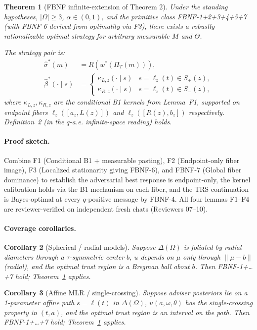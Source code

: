 \documentclass[11pt]{article}
\newtheorem{theorem}{Theorem}
\newtheorem{corollary}[theorem]{Corollary}
\theoremstyle{definition}
\theoremstyle{remark}
\begin{document}
\begin{theorem}[FBNF infinite-extension of Theorem 2]\label{thm:fbnf}
Under the standing hypotheses, $|\Omega|\ge 3$, $\alpha\in(0,1)$, and
the primitive class FBNF-1+2+3+4+5+7 (with FBNF-6 derived from optimality
via F3), there exists a robustly rationalizable optimal strategy for
\emph{arbitrary measurable $M$ and $\Theta$}.

The strategy pair is:
\begin{align*}
  \hat\sigma^*(m) &= R(w^*(\Pi_T(m))), \\
  \hat\beta^*(\cdot\mid s) &= \begin{cases}
    \kappa_{L,z}(\cdot\mid s) & s = \ell_z(t)\in S_+(z), \\
    \kappa_{R,z}(\cdot\mid s) & s = \ell_z(t)\in S_-(z),
  \end{cases}
\end{align*}
where $\kappa_{L,z}, \kappa_{R,z}$ are the conditional B1 kernels
from Lemma~F1, supported on endpoint fibers $\ell_z([a_z, L(z)])$ and
$\ell_z([R(z), b_z])$ respectively. Definition~2 (in the $q$-a.e.
infinite-space reading) holds.
\end{theorem}

\paragraph{Proof sketch.} Combine F1 (Conditional B1 + measurable
pasting), F2 (Endpoint-only fiber image), F3 (Localized stationarity
giving FBNF-6), and FBNF-7 (Global fiber dominance) to establish the
adversarial best response is endpoint-only, the kernel calibration
holds via the B1 mechanism on each fiber, and the TRS continuation is
Bayes-optimal at every $q$-positive message by FBNF-4. All four lemmas
F1--F4 are reviewer-verified on independent fresh chats (Reviewers
07--10).

\paragraph{Coverage corollaries.}
\begin{corollary}[Spherical / radial models]\label{cor:sphere}
Suppose $\Delta(\Omega)$ is foliated by radial diameters through a
$\tau$-symmetric center $b$, $u$ depends on $\mu$ only through
$\|\mu-b\|$ (radial), and the optimal trust region is a Bregman ball
about $b$. Then FBNF-1+\dots+7 hold; Theorem~\ref{thm:fbnf} applies.
\end{corollary}

\begin{corollary}[Affine MLR / single-crossing]\label{cor:mlr}
Suppose adviser posteriors lie on a 1-parameter affine path
$s = \ell(t)$ in $\Delta(\Omega)$, $u(a, \omega, \theta)$ has the
single-crossing property in $(t, a)$, and the optimal trust region is
an interval on the path. Then FBNF-1+\dots+7 hold;
Theorem~\ref{thm:fbnf} applies.
\end{corollary}
\end{document}
